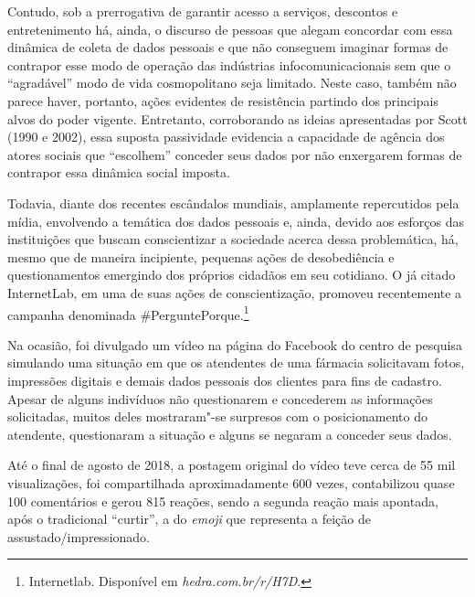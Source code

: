 Contudo, sob a prerrogativa de garantir acesso a serviços, descontos e
entretenimento há, ainda, o discurso de pessoas que alegam concordar com
essa dinâmica de coleta de dados pessoais e que não conseguem imaginar
formas de contrapor esse modo de operação das indústrias
infocomunicacionais sem que o ``agradável'' modo de vida cosmopolitano
seja limitado. Neste caso, também não parece haver, portanto, ações
evidentes de resistência partindo dos principais alvos do poder vigente.
Entretanto, corroborando as ideias apresentadas por Scott (1990 e 2002),
essa suposta passividade evidencia a capacidade de agência dos atores
sociais que ``escolhem'' conceder seus dados por não enxergarem formas
de contrapor essa dinâmica social imposta.

Todavia, diante dos recentes escândalos mundiais, amplamente
repercutidos pela mídia, envolvendo a temática dos dados pessoais e,
ainda, devido aos esforços das instituições que buscam conscientizar a
sociedade acerca dessa problemática, há, mesmo que de maneira
incipiente, pequenas ações de desobediência e questionamentos emergindo
dos próprios cidadãos em seu cotidiano. O já citado InternetLab, em uma
de suas ações de conscientização, promoveu recentemente a campanha
denominada \#PerguntePorque.\footnote{Internetlab. Disponível em \textit{hedra.com.br/r/H7D}.}

Na ocasião, foi divulgado um vídeo na página do Facebook do centro de
pesquisa simulando uma situação em que os atendentes de uma fármacia
solicitavam fotos, impressões digitais e demais dados pessoais dos
clientes para fins de cadastro. Apesar de alguns indivíduos não
questionarem e concederem as informações solicitadas, muitos deles
mostraram"-se surpresos com o posicionamento do atendente, questionaram a
situação e alguns se negaram a conceder seus dados.


Até o final de agosto de 2018, a postagem original do vídeo teve cerca
de 55 mil visualizações, foi compartilhada aproximadamente 600 vezes,
contabilizou quase 100 comentários e gerou 815 reações, sendo a segunda
reação mais apontada, após o tradicional ``curtir'', a do \textit{emoji}
que representa a feição de assustado/impressionado.

